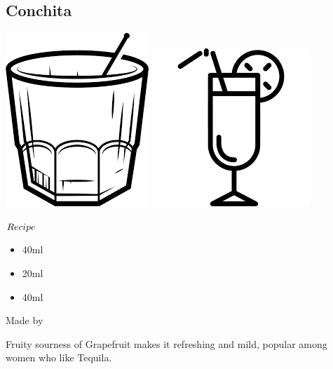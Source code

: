 \subsection{Conchita}
\vspace{-7mm}
\hspace{32mm}
\includegraphics[scale=.06]{cocktail_glass_rock.png}
\includegraphics[scale=.07]{cocktail_glass_tall.png}
\vspace{2.5mm}
\begin{itembox}[l]{\boldmath $Recipe$}
\begin{itemize}
\setlength{\parskip}{0cm}
\setlength{\itemsep}{0cm}
\item \teq 40ml
\item \wc 20ml
\item \gj 40ml
\end{itemize}
\vspace{-4mm}
Made by \shake
\end{itembox}
Fruity sourness of Grapefruit makes it refreshing and mild, popular among women who like Tequila.
